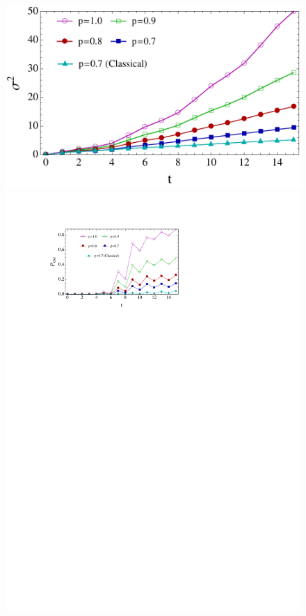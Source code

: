 \documentclass[aps,pra,twocolumn,amsmath,amssymb,nofootinbib,superscriptaddress]{revtex4}
\begin{document}
\begin{figure}[] 
\includegraphics[scale=0.508]{VarVsTVaryingP.pdf}
\includegraphics[scale=0.88]{PescVsTVaryingP.pdf} 

\end{figure}
\end{document}
